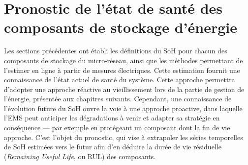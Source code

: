 \section{Pronostic de l'état de santé des composants de stockage d'énergie}
%
%
Les sections précédentes ont établi les définitions du SoH pour chacun des composants de stockage du micro-réseau, ainsi que les méthodes permettant de l'estimer en ligne à partir de mesures électriques. Cette estimation fournit une connaissance de l'état actuel de santé du système. Cette approche permettra d'adopter une approche réactive au vieillissement lors de la partie de gestion de l'énergie, présentée aux chapitres suivants. Cependant, une connaissance de l'évolution future du SoH ouvre la voie à une approche proactive, dans laquelle l'EMS peut anticiper les dégradations à venir et adapter sa stratégie en conséquence — par exemple en protégeant un composant dont la fin de vie approche. C'est l'objet du pronostic, qui vise à extrapoler les séries temporelles de SoH estimées vers le futur afin d'en déduire la durée de vie résiduelle (\textit{Remaining Useful Life}, ou RUL) des composants.

